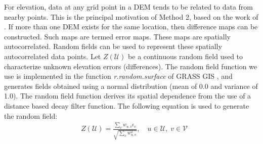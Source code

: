 \documentclass[12pt]{article}
\begin{document}
For elevation, data at any grid point in a DEM tends to be related to
data from nearby points.  This is the principal motivation of Method
2, based on the work of \citep{Ehlschlaeger_1994}. If more than one
DEM exists for the same location, then difference maps can be
constructed. Such maps are termed error maps. These maps are spatially
autocorrelated.  Random fields can be used to represent these
spatially autocorrelated data points.  Let $Z(\mathcal{U})$ be a
continuous random field used to characterize unknown elevation errors
(differences).
The random field function we use is implemented in the function
\textit{r.random.surface} \citep{Ehlschlaeger_1994} of GRASS GIS
\citep{Mitasova1996}, and generates fields obtained using a normal
distribution (mean of 0.0 and variance of 1.0). The random field
function derives its spatial dependence from the use of a distance
based decay filter function. The following equation is used to
generate the random field:
\begin{align}
  &Z(\mathcal{U})= \frac{\sum_v w_{u,v}\epsilon_v}{\sqrt{\sum_v
      w_{u,v}^2}}, \quad u\in \mathcal{U}, \; v \in \mathcal{V}
 \label{eqn1}
 \end{align}
\end{document}
